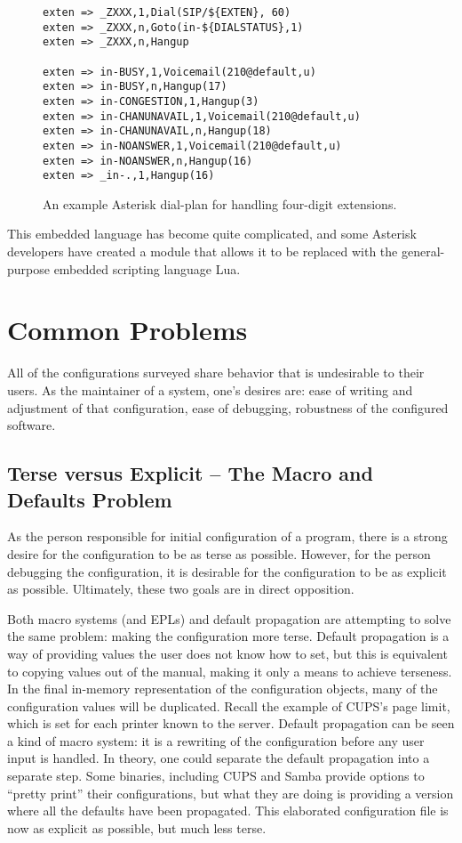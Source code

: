 \documentclass[letterpaper,twocolumn,10pt]{article}
\begin{document}
\begin{figure}
\caption{\label{fig:ast}An example Asterisk dial-plan for handling four-digit extensions.}
\scriptsize
\begin{verbatim}
exten => _ZXXX,1,Dial(SIP/${EXTEN}, 60)
exten => _ZXXX,n,Goto(in-${DIALSTATUS},1)
exten => _ZXXX,n,Hangup

exten => in-BUSY,1,Voicemail(210@default,u)
exten => in-BUSY,n,Hangup(17)
exten => in-CONGESTION,1,Hangup(3)
exten => in-CHANUNAVAIL,1,Voicemail(210@default,u)
exten => in-CHANUNAVAIL,n,Hangup(18)
exten => in-NOANSWER,1,Voicemail(210@default,u)
exten => in-NOANSWER,n,Hangup(16)
exten => _in-.,1,Hangup(16)
\end{verbatim}
\end{figure}

This embedded language has become quite complicated, and some Asterisk developers have created a module that allows it to be replaced with the general-purpose embedded scripting language Lua.

\section{Common Problems}
All of the configurations surveyed share behavior that is undesirable to their users. As the maintainer of a system, one's desires are: ease of writing and adjustment of that configuration, ease of debugging, robustness of the configured software.

\subsection{Terse versus Explicit -- The Macro and Defaults Problem}
As the person responsible for initial configuration of a program, there is a strong desire for the configuration to be as terse as possible. However, for the person debugging the configuration, it is desirable for the configuration to be as explicit as possible. Ultimately, these two goals are in direct opposition.

Both macro systems (and EPLs) and default propagation are attempting to solve the same problem: making the configuration more terse. Default propagation is a way of providing values the user does not know how to set, but this is equivalent to copying values out of the manual, making it only a means to achieve terseness. In the final in-memory representation of the configuration objects, many of the configuration values will be duplicated. Recall the example of CUPS's page limit, which is set for each printer known to the server. Default propagation can be seen a kind of macro system: it is a rewriting of the configuration before any user input is handled. In theory, one could separate the default propagation into a separate step. Some binaries, including CUPS and Samba provide options to ``pretty print'' their configurations, but what they are doing is providing a version where all the defaults have been propagated. This elaborated configuration file is now as explicit as possible, but much less terse.
\end{document}
